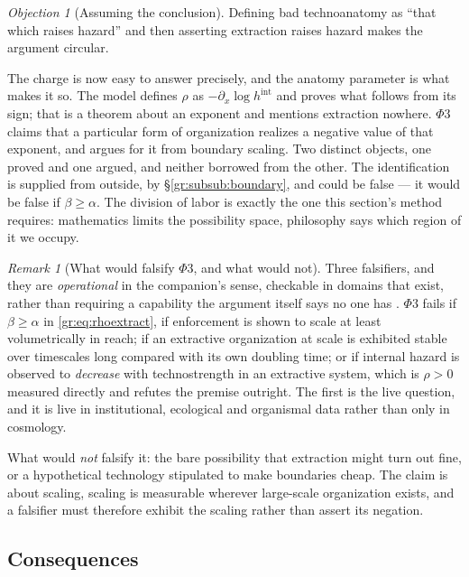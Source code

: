 \documentclass[11pt]{article}
\numberwithin{equation}{section}
\theoremstyle{plain}
\theoremstyle{definition}
\theoremstyle{remark}
\newtheorem{remark}[theorem]{Remark}
\newtheorem{objection}[theorem]{Objection}
\begin{document}
\begin{objection}[Assuming the conclusion]\label{gr:obj:circular}
Defining bad technoanatomy as ``that which raises hazard'' and then
asserting extraction raises hazard makes the argument circular.
\end{objection}

\noindent The charge is now easy to answer precisely, and the anatomy
parameter is what makes it so. The model defines $\rho$ as
$-\partial_x\log h^{\mathrm{int}}$ and proves what follows from its
sign; that is a theorem about an exponent and mentions extraction
nowhere. $\Phi3$ claims that a particular form of organization realizes
a negative value of that exponent, and argues for it from boundary
scaling. Two distinct objects, one proved and one argued, and neither
borrowed from the other. The identification is supplied from outside,
by \S\ref{gr:subsub:boundary}, and could be false --- it would be false
if $\beta\ge\alpha$. The division of labor is exactly the one this section's method
requires: mathematics limits the possibility space, philosophy says
which region of it we occupy.

\begin{remark}[What would falsify $\Phi3$, and what would not]
\label{gr:rem:falsify}
Three falsifiers, and they are \emph{operational} in the companion's
sense, checkable in domains that exist, rather than requiring a
capability the argument itself says no one has \cite{Ben26Optimal}.
$\Phi3$ fails if $\beta\ge\alpha$ in \eqref{gr:eq:rhoextract}, if
enforcement is shown to scale at least volumetrically in reach; if an
extractive organization at scale is exhibited stable over timescales
long compared with its own doubling time; or if internal hazard is
observed to \emph{decrease} with technostrength in an extractive system,
which is $\rho>0$ measured directly and refutes the premise outright. The first
is the live question, and it is live in institutional, ecological and
organismal data rather than only in cosmology.

What would \emph{not} falsify it: the bare possibility that extraction
might turn out fine, or a hypothetical technology stipulated to make
boundaries cheap. The claim is about scaling, scaling is measurable
wherever large-scale organization exists, and a falsifier must therefore
exhibit the scaling rather than assert its negation.
\end{remark}

\subsection{Consequences}\label{gr:sub:consequences}
\end{document}
